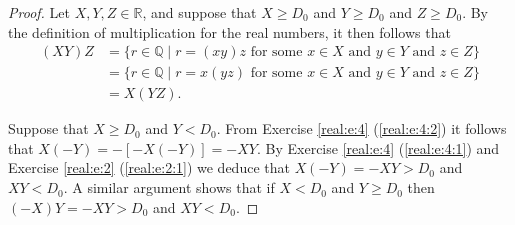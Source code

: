 \begin{proof}
	\hfill

	Let $X, Y, Z \in \mathbb{R}$, and suppose that $X \geq D_0$ and $Y \geq D_0$ and $Z \geq D_0$. By the definition of multiplication for the real numbers, it then follows that
	\begin{align*}
		(X Y) Z & = \{ r \in \mathbb{Q} \mid r = (x y)z \text{ for some } x \in X \text{ and } y \in Y \text{ and } z \in Z \}  \\
		        & = \{ r \in \mathbb{Q} \mid r = x (y z) \text{ for some } x \in X \text{ and } y \in Y \text{ and } z \in Z \} \\
		        & = X (Y Z).
	\end{align*}

	Suppose that $X \geq D_0$ and $Y < D_0$. From Exercise \ref{real:e:4} (\ref{real:e:4:2}) it follows that $X (-Y) = -[-X (-Y)] = - X Y$. By Exercise \ref{real:e:4} (\ref{real:e:4:1}) and Exercise \ref{real:e:2} (\ref{real:e:2:1}) we deduce that $X (-Y) = - X Y > D_0$ and $X Y < D_0$. A similar argument shows that if $X < D_0$ and $Y \geq D_0$ then $(-X) Y = -X Y > D_0$ and $X Y < D_0$.


\end{proof}
